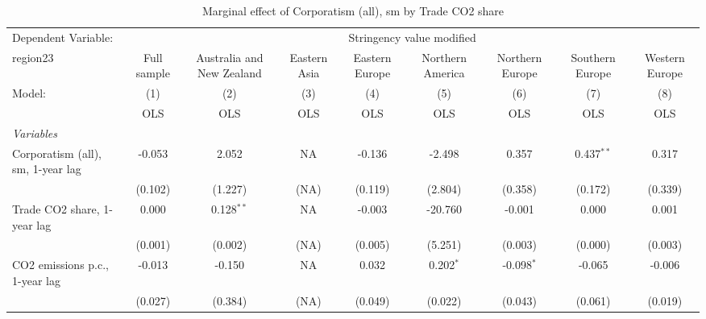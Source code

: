 
\begin{table}[htbp]
   \caption{Marginal effect of Corporatism (all), sm by Trade CO2 share}
   \centering
   \begin{tabular}{lcccccccc}
      \toprule
      Dependent Variable: & \multicolumn{8}{c}{Stringency value modified}\\
      region23                                                        & Full sample   & Australia and New Zealand & Eastern Asia & Eastern Europe & Northern America & Northern Europe & Southern Europe & Western Europe \\   
      Model:                                                          & (1)           & (2)                       & (3)          & (4)            & (5)              & (6)             & (7)             & (8)\\  
                                                                      &  OLS          & OLS                       & OLS          & OLS            & OLS              & OLS             & OLS             & OLS\\  
      \midrule
      \emph{Variables}\\
      Corporatism (all), sm, 1-year lag                               & -0.053        & 2.052                     & NA           & -0.136         & -2.498           & 0.357           & 0.437$^{**}$    & 0.317\\   
                                                                      & (0.102)       & (1.227)                   & (NA)         & (0.119)        & (2.804)          & (0.358)         & (0.172)         & (0.339)\\   
      Trade CO2 share, 1-year lag                                     & 0.000         & 0.128$^{**}$              & NA           & -0.003         & -20.760          & -0.001          & 0.000           & 0.001\\   
                                                                      & (0.001)       & (0.002)                   & (NA)         & (0.005)        & (5.251)          & (0.003)         & (0.000)         & (0.003)\\   
      CO2 emissions p.c., 1-year lag                                  & -0.013        & -0.150                    & NA           & 0.032          & 0.202$^{*}$      & -0.098$^{*}$    & -0.065          & -0.006\\   
                                                                      & (0.027)       & (0.384)                   & (NA)         & (0.049)        & (0.022)          & (0.043)         & (0.061)         & (0.019)\\   

\end{tabular}
\end{table}

